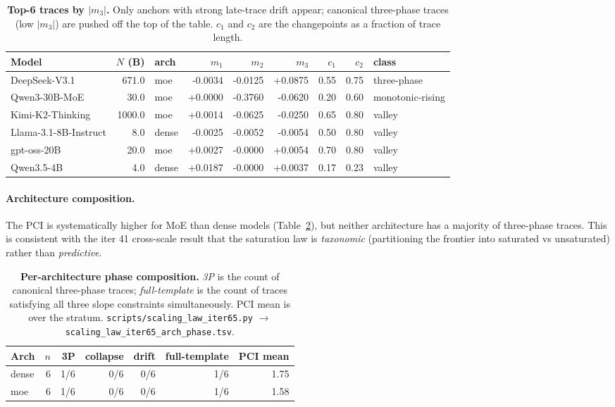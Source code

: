 \documentclass{article}
\providecommand{\tableref}[1]{Table~\ref{#1}}
\begin{document}
\begin{table}[t]
  \centering
  \small
  \begin{tabular}{lrlrrrrrl}
    \toprule
    Model & $N$ (B) & arch & $m_1$ & $m_2$ & $m_3$ & $c_1$ & $c_2$ & class \\
    \midrule
      DeepSeek-V3.1 & 671.0 & moe & -0.0034 & -0.0125 & +0.0875 & 0.55 & 0.75 & three-phase \\
      Qwen3-30B-MoE & 30.0 & moe & +0.0000 & -0.3760 & -0.0620 & 0.20 & 0.60 & monotonic-rising \\
      Kimi-K2-Thinking & 1000.0 & moe & +0.0014 & -0.0625 & -0.0250 & 0.65 & 0.80 & valley \\
      Llama-3.1-8B-Instruct & 8.0 & dense & -0.0025 & -0.0052 & -0.0054 & 0.50 & 0.80 & valley \\
      gpt-oss-20B & 20.0 & moe & +0.0027 & -0.0000 & +0.0054 & 0.70 & 0.80 & valley \\
      Qwen3.5-4B & 4.0 & dense & +0.0187 & -0.0000 & +0.0037 & 0.17 & 0.23 & valley \\
    \bottomrule
  \end{tabular}
  \caption{\textbf{Top-6 traces by $|m_3|$.}  Only anchors with
    strong late-trace drift appear; canonical three-phase traces
    (low $|m_3|$) are pushed off the top of the table.  $c_1$ and
    $c_2$ are the changepoints as a fraction of trace length.}
  \label{tab:iter65-top-slopes}
\end{table}

\paragraph{Architecture composition.}
The PCI is systematically higher for MoE than dense models
(\tableref{tab:iter65-arch}), but neither architecture has a
majority of three-phase traces.  This is consistent with the
iter 41 cross-scale result that the saturation law is
\emph{taxonomic} (partitioning the frontier into saturated vs
unsaturated) rather than \emph{predictive}.

\begin{table}[t]
  \centering
  \small
  \begin{tabular}{lrrrrrr}
    \toprule
    Arch & $n$ & 3P & collapse & drift & full-template & PCI mean \\
    \midrule
      dense & 6 & 1/6 & 0/6 & 0/6 & 1/6 & 1.75 \\
      moe & 6 & 1/6 & 0/6 & 0/6 & 1/6 & 1.58 \\
    \bottomrule
  \end{tabular}
  \caption{\textbf{Per-architecture phase composition.}
    \emph{3P} is the count of canonical three-phase traces;
    \emph{full-template} is the count of traces satisfying all
    three slope constraints simultaneously.  PCI mean is over
    the stratum.  \texttt{scripts/scaling\_law\_iter65.py}
    $\to$ \texttt{scaling\_law\_iter65\_arch\_phase.tsv}.}
  \label{tab:iter65-arch}
\end{table}
\end{document}
